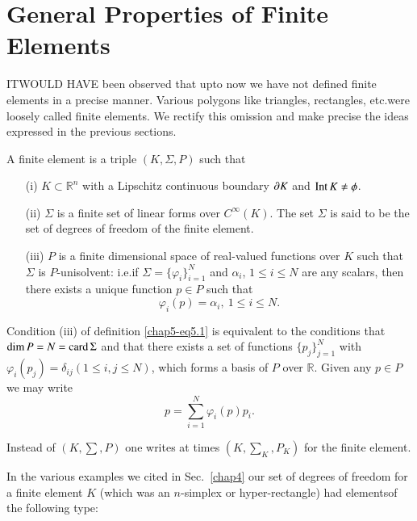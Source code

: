 
\chapter{General Properties of Finite Elements}\label{chap5}

IT\pageoriginale WOULD HAVE been observed that upto now we have not
defined finite elements in a precise manner. Various polygons like
triangles, rectangles, etc.\@ were loosely called finite elements. We
rectify this omission and make precise the ideas expressed in the
previous sections.

\begin{definition}\label{chap5-defi5.1}
A finite element is a triple $(K,\Sigma,P)$ such that
\begin{itemize}
\item[(i)] $K\subset \mathbb{R}^{n}$ with a Lipschitz continuous
  boundary $\partial K$ and $\operatorname*{Int} K\neq \phi$.

\item[(ii)] $\Sigma$ is a finite set of linear forms over
  $C^{\infty}(K)$. The set $\Sigma$ is said to be the set of degrees
  of freedom of the finite element.

\item[(iii)] $P$ is a finite dimensional space of real-valued
  functions over $K$ such that $\Sigma$ is $P$-unisolvent: i.e.\@ if
  $\Sigma=\{\varphi_{i}\}^{N}_{i=1}$ and $\alpha_{i}$, $1\leq i\leq N$
  are any scalars, then there exists a unique function $p\in P$ such
  that 
\begin{equation*}
\varphi_{i}(p)=\alpha_{i},\ 1\leq i\leq N.\tag{5.1}\label{chap5-eq5.1}
\end{equation*}
\end{itemize}
\end{definition}

Condition (iii) of definition \eqref{chap5-eq5.1} is equivalent to the
conditions that $\dim P=N=\operatorname{card}\Sigma$ and that there exists a set of
functions $\{p_{j}\}^{N}_{j=1}$ with
$\varphi_{i}(p_{j})=\delta_{ij}(1\leq i,j\leq N)$, which forms a basis
of $P$ over $\mathbb{R}$. Given any $p\in P$ we may write
\begin{equation*}
p=\sum^{N}_{i=1}\varphi_{i}(p)p_{i}.\tag{5.2}\label{chap5-eq5.2}
\end{equation*}

Instead of $(K, \sum, P)$ one writes at times $(K, \sum_K, P_K)$ for the finite element. 

In the various examples we cited in Sec.~\ref{chap4} our set of
degrees of freedom for a finite element $K$ (which was an $n$-simplex
or hyper-rectangle) had elements\pageoriginale of the following type:


